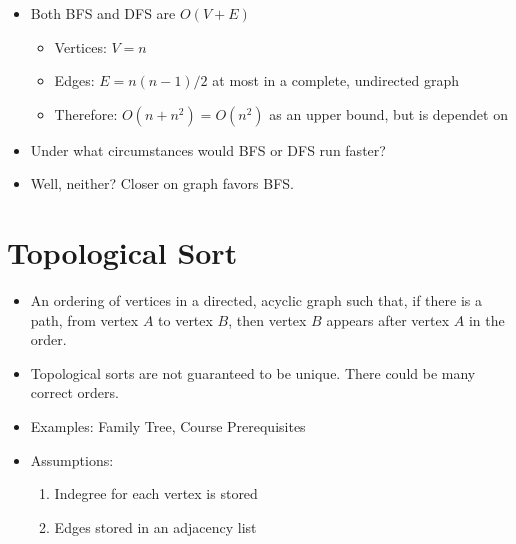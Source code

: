 \documentclass[12pt]{article}
\begin{document}
\begin{itemize}

    \item Both BFS and DFS are $O(V + E)$
    \begin{itemize}
        \item Vertices: $V = n$
        \item Edges: $E = n(n-1)/2$ at most in a complete, undirected graph
        \item Therefore: $O(n + n^2) = O(n^2)$ as an upper bound, but is dependet on
    \end{itemize}

    \item Under what circumstances would BFS or DFS run faster?

    \item Well, neither? Closer on graph favors BFS.

\end{itemize}

\section*{Topological Sort}

\begin{itemize}

    \item An ordering of vertices in a directed, acyclic graph such that, if there is a path, from vertex $A$ to vertex $B$, then vertex $B$ appears after vertex $A$ in the order. \\
    
\end{itemize}


\begin{itemize}

    \item Topological sorts are not guaranteed to be unique. There could be many correct orders.

    \item Examples: Family Tree, Course Prerequisites

    \item Assumptions:
    \begin{enumerate}
        \item Indegree for each vertex is stored
        \item Edges stored in an adjacency list
    \end{enumerate}

\end{itemize}
\end{document}
